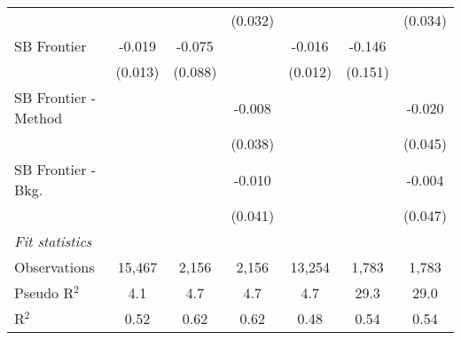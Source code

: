 \begin{tabular}{lcccccc}
                        &              &              & (0.032) &              &               & (0.034)\\   
   SB Frontier          & -0.019       & -0.075       &         & -0.016       & -0.146        &   \\   
                        & (0.013)      & (0.088)      &         & (0.012)      & (0.151)       &   \\   
   SB Frontier - Method &              &              & -0.008  &              &               & -0.020\\   
                        &              &              & (0.038) &              &               & (0.045)\\   
   SB Frontier - Bkg.   &              &              & -0.010  &              &               & -0.004\\   
                        &              &              & (0.041) &              &               & (0.047)\\   
   \midrule
   \emph{Fit statistics}\\
   Observations         & 15,467       & 2,156        & 2,156   & 13,254       & 1,783         & 1,783\\  
   Pseudo R$^2$         & 4.1          & 4.7          & 4.7     & 4.7          & 29.3          & 29.0\\  
   R$^2$                & 0.52         & 0.62         & 0.62    & 0.48         & 0.54          & 0.54\\  
   

\end{tabular}
